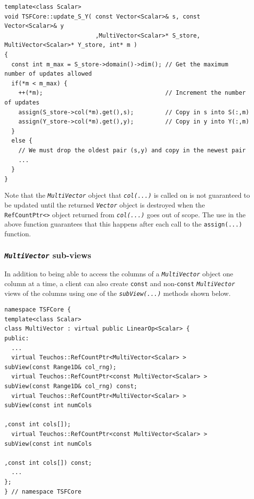 {\scriptsize\begin{verbatim}
template<class Scalar>
void TSFCore::update_S_Y( const Vector<Scalar>& s, const Vector<Scalar>& y
                          ,MultiVector<Scalar>* S_store, MultiVector<Scalar>* Y_store, int* m )
{
  const int m_max = S_store->domain()->dim(); // Get the maximum number of updates allowed
  if(*m < m_max) {
    ++(*m);                                   // Increment the number of updates
    assign(S_store->col(*m).get(),s);         // Copy in s into S(:,m)         
    assign(Y_store->col(*m).get(),y);         // Copy in y into Y(:,m)
  }
  else {
    // We must drop the oldest pair (s,y) and copy in the newest pair
    ...
  }
}
\end{verbatim}}

{}\noindent{}Note that the {}\texttt{\textit{Multi\-Vector}} object
that {}\texttt{\textit{col(...)}} is called on is not guaranteed to be
updated until the returned {}\texttt{\textit{Vector}} object is
destroyed when the {}\texttt{RefCountPtr<>} object returned from
{}\texttt{\textit{col(...)}} goes out of scope.  The use in the above
function guarantees that this happens after each call to the
{}\texttt{assign(...)} function.

%
\subsubsection{\texttt{\textit{Multi\-Vector}} sub-views}
%

In addition to being able to access the columns of a
{}\texttt{\textit{Multi\-Vector}} object one column at a time, a client
can also create {}\texttt{const} and non-\texttt{const}
{}\texttt{\textit{Multi\-Vector}} views of the columns
using one of the {}\texttt{\textit{subView(...)}} methods shown below.

{\scriptsize\begin{verbatim}
namespace TSFCore {
template<class Scalar>
class MultiVector : virtual public LinearOp<Scalar> {
public:
  ...
  virtual Teuchos::RefCountPtr<MultiVector<Scalar> >       subView(const Range1D& col_rng);
  virtual Teuchos::RefCountPtr<const MultiVector<Scalar> > subView(const Range1D& col_rng) const;
  virtual Teuchos::RefCountPtr<MultiVector<Scalar> >       subView(const int numCols
                                                                        ,const int cols[]);
  virtual Teuchos::RefCountPtr<const MultiVector<Scalar> > subView(const int numCols
                                                                        ,const int cols[]) const;
  ...
};
} // namespace TSFCore
\end{verbatim}}

